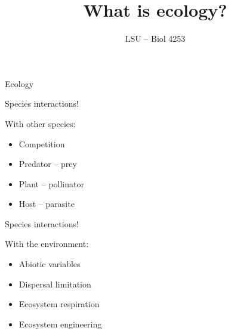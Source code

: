 \documentclass[12pt]{beamer}
\title{\Large What is ecology?}
\author{LSU -- Biol 4253}
\date{}
\begin{document}
\maketitle











\begin{frame}

	\begin{flushright}
	  \Large \textcolor{boss2}{Ecology} 
	\end{flushright}
\end{frame}







\begin{frame}

	\begin{flushright}
	  {\Large \textcolor{boss2}{Species interactions!}}
	\end{flushright}

  With other species:
  \begin{itemize}
    \item Competition
    \item Predator -- prey
    \item Plant -- pollinator
    \item Host -- parasite
  \end{itemize}  

\end{frame}




\begin{frame}

	\begin{flushright}
	  {\Large \textcolor{boss2}{Species interactions!}}
	\end{flushright}

  With the environment:
  \begin{itemize}
    \item Abiotic variables
    \item Dispersal limitation
    \item Ecosystem respiration 
    \item Ecosystem engineering
  \end{itemize}  
\end{frame}
\end{document}
